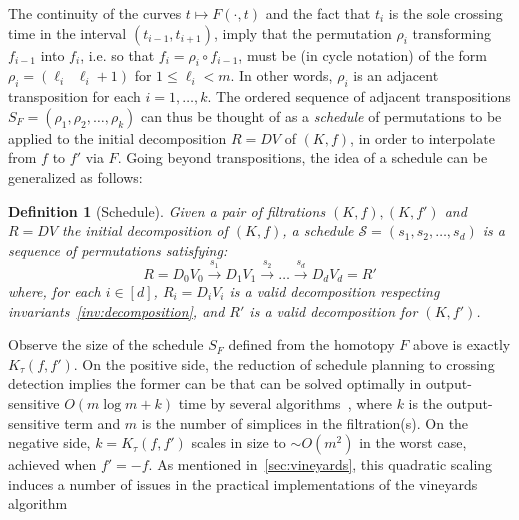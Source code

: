 \documentclass[sn-mathphys]{sn-jnl}
\newtheorem{definition}{Definition}
\begin{document}
The continuity of the curves $t\mapsto F(\cdot, t)$ and the fact that $t_i$ is the sole crossing time  in the interval $(t_{i-1}, t_{i+1})$, imply that the
permutation $\rho_i $   
transforming $f_{i-1}$ into $f_i$, i.e. so that  $f_i = \rho_i \circ f_{i-1}$, must be (in cycle notation) of the form 
$\rho_i = (\ell_i \;\; \ell_i +1 )$ for $1 \leq \ell_i < m$. In other words, $\rho_i$ is an adjacent transposition for each $i =1,\ldots, k$.
The ordered sequence of adjacent transpositions  
$S_F = (\rho_1, \rho_2, \ldots, \rho_k)$ can thus be thought of as a \emph{schedule} of permutations to be applied to the initial decomposition $R = DV$ of $(K,f)$, in order to   interpolate from $f$ to $f'$ via $F$. 
Going beyond transpositions, the idea of a schedule can be generalized as follows:
\begin{definition}[Schedule]\label{def:schedule}
Given a pair of filtrations $(K, f), (K,f')$ 
and $R = DV$ the initial decomposition of $(K, f)$, a \emph{schedule}  $\mathcal{S} = (s_1, s_2, \dots, s_d )$ is a sequence of permutations  satisfying: 
	\begin{equation}\label{eq:rv_seq_schedule}
   		R = D_0 V_0 \overset{s_1}{\to} D_1 V_{1} \overset{s_2}{\to} \dots \overset{s_d}{\to} D_d V_{d} = R'
   	\end{equation}
   	where, for each $i \in [d]$, $R_i = D_i V_i$ is a valid decomposition respecting invariants~\ref{inv:decomposition}, and $R'$ is a valid decomposition for $(K,f')$.
\end{definition}
\noindent Observe the size of the schedule $S_F$ defined from the homotopy $F$ above is exactly $K_\tau(f,f')$.
On the positive side, the reduction of schedule planning to crossing detection implies the former can be  that can be solved optimally in output-sensitive $O(m \log m + k)$ time by several algorithms~\cite{boissonnat2000efficient}, where $k$ is the output-sensitive term and $m$ is the number of simplices in the filtration(s).
On  the negative side, $k = K_\tau(f,f')$ scales in size to $\sim O(m^2)$ in the worst case, achieved when $f' = - f$. As mentioned in~\ref{sec:vineyards}, this quadratic scaling induces a number of issues in the practical implementations of the vineyards algorithm
\end{document}

